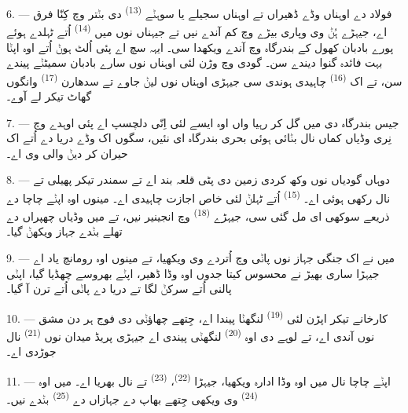 6. --- فولاد دے اوہناں وڈے ڈھیراں تے اوہناں سجیلے  یا سوہݨے
 \textsuperscript{(13)} دی بݨتر وچ کِنّا فرق اے، جیہڑے ہُݨ وی
وپاری بیڑے وچ کم آندے نیں تے جیہناں نوں میں 
\textsuperscript{(14)} اُتے ٹہلدے ہوئے پورے بادبان کھول کے بندرگاہ وچ آندے ویکھدا سی۔
ایہہ سچ اے پئی  اُلٹ ہوݨ اُتے اوہ اپݨا بہت فائدہ گنوا دیندے سن۔ گودی
وچ وڑن لئی اوہناں نوں سارے بادبان سمیٹݨے پیندے سن، تے اک 
\textsuperscript{(16)} چاہیدی ہوندی سی جیہڑی اوہناں نوں لیݨ جاوے تے سدھارن
 \textsuperscript{(17)} وانگوں گھاٹ تیکر لے آوے۔

\VUsaut{3.0mm}
\VUsaut{3.0mm}

7. --- جیس بندرگاہ دی میں گل کر رہیا واں اوہ ایسے لئی اِنّی دلچسپ اے پئی اوہدے
وچ نِری وڈیاں کماں نال بݨائی ہوئی بحری بندرگاہ ای نئیں، سگوں اک وڈے دریا دے
 اُتے اک حیران کر دیݨ والی  وی اے۔

8. --- دوہاں گودیاں نوں وکھ کردی زمین دی پٹی قلعہ بند اے تے سمندر تیکر پھیلی
 تے  نال رکھی ہوئی اے۔ 
\textsuperscript{(15)} اُتے ٹہلݨ لئی خاص اجازت چاہیدی اے۔ مینوں اوہ اپݨے چاچا دے
ذریعے سوکھی ای مل گئی سی، جیہڑے  \textsuperscript{(18)}
وچ انجینیر نیں، تے میں وڈیاں چھپراں دے تھلے بݨدے جہاز ویکھݨ گیا۔

9. --- میں نے اک جنگی جہاز نوں پاݨی وچ اُتردے وی ویکھیا، تے مینوں اوہ رومانچ یاد
اے جیہڑا ساری بھیڑ نے محسوس کیتا جدوں اوہ وڈا ڈھیر، اپݨے بھروسے چھڈیا گیا، اپݨی
پالنی اُتے سرکݨ لگا تے دریا دے پاݨی اُتے ترن آ گیا۔

10. --- کارخانے تیکر اپڑن لئی  \textsuperscript{(19)} لنگھݨا
پیندا اے، جِتھے چھاؤݨی دی فوج ہر دن مشق نوں آندی اے، تے لوہے دی اوہ
 \textsuperscript{(20)} لنگھݨی پیندی اے جیہڑی پریڈ میدان نوں
 \textsuperscript{(21)} نال جوڑدی اے۔

\VUsaut{3.0mm}
\VUsaut{3.0mm}

11. --- اپݨے چاچا نال میں اوہ وڈا ادارہ ویکھیا، جیہڑا 
\textsuperscript{(22)}،  \textsuperscript{(23)} تے  نال
بھریا اے۔ میں اوہ  \textsuperscript{(24)} وی ویکھی جِتھے بھاپ دے
جہازاں دے  \textsuperscript{(25)} بݨدے نیں۔

